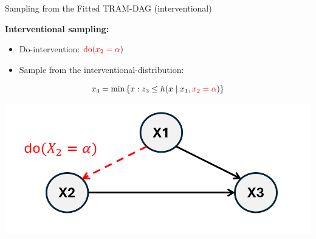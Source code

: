 \documentclass[onlytextwidth,english]{beamer}\usepackage[]{graphicx}\usepackage[]{xcolor}
\begin{document}
\begin{frame}{Sampling from the Fitted TRAM-DAG (interventional)}

\textbf{Interventional sampling:} \\

\begin{itemize}
    \item Do-intervention: \( \textcolor{red}{\text{do}(x_2 = \alpha})\)
    \item Sample from the interventional-distribution:
\end{itemize}
\[
x_3 = \min \left\{ x : z_3 \le h(x \mid x_1, \textcolor{red}{x_2 = \alpha}) \right\}
\]

\centering
\includegraphics[width=0.5\linewidth]{img/interventional.png}


\end{frame}
\end{document}
